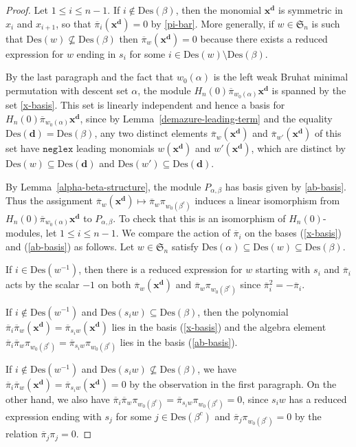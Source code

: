 \documentclass[10pt]{amsart}
\theoremstyle{definition}
\newcommand{\Des}{{\mathrm {Des}}}
\newcommand{\neglex}{{\mathtt {neglex}}}
\newcommand{\symm}{{\mathfrak{S}}}
\newcommand{\xx}{{\mathbf {x}}}
\newcommand{\dd}{{\mathbf {d}}}
\newcommand{\pib}{\overline{\pi}}
\begin{document}
\begin{proof}
Let $1 \leq i \leq n-1$.  If $i \notin \Des(\beta)$, then the monomial $\xx^{\dd}$ is symmetric in $x_i$ and $x_{i+1}$,
so that $\pib_i(\xx^{\dd}) = 0$ by \eqref{pi-bar}.  
More generally, if $w \in \symm_n$ is such that $\Des(w) \not\subseteq \Des(\beta)$ then $\pib_w(\xx^{\dd}) = 0$ because there exists a reduced expression for $w$ ending in $s_i$ for some $i\in\Des(w)\setminus\Des(\beta)$.

By the last paragraph and the fact that $w_0(\alpha)$ is the left weak
Bruhat minimal permutation with descent set $\alpha$,
the module $H_n(0) \pib_{w_0(\alpha)} \xx^{\dd}$ is spanned by the set \eqref{x-basis}.
This set is linearly independent and hence a basis for $H_n(0) \pib_{w_0(\alpha)} \xx^{\dd}$, since by Lemma~\ref{demazure-leading-term} and the equality $\Des(\dd) = \Des(\beta)$, any two distinct elements $\pib_w(\xx^{\dd})$ and $\pib_{w'}(\xx^{\dd})$ of this set have $\neglex$ leading monomials $w(\xx^\dd)$ and $w'(\xx^\dd)$, which are distinct by $\Des(w)\subseteq \Des(\dd)$ and $\Des(w')\subseteq \Des(\dd)$.

By Lemma~\ref{alpha-beta-structure}, the module
$P_{\alpha,\beta}$ has basis given by \eqref{ab-basis}.
Thus the assignment $\pib_w(\xx^{\dd}) \mapsto \pib_w \pi_{w_0(\beta^c)}$ induces a linear isomorphism
from $H_n(0) \pib_{w_0(\alpha)} \xx^{\dd}$  to $P_{\alpha,\beta}$.  To check that this is an isomorphism of 
$H_n(0)$-modules, let $1 \leq i \leq n-1$.  We compare the action of $\pib_i$ on the bases 
(\ref{x-basis}) and (\ref{ab-basis}) as follows.  Let $w \in \symm_n$ satisfy 
$\Des(\alpha) \subseteq \Des(w) \subseteq \Des(\beta)$.

If $i \in \Des(w^{-1})$, then there is a reduced
expression for $w$ starting with $s_i$ and
 $\pib_i$ acts by the scalar $-1$ on both $\pib_w(\xx^{\dd})$
and $\pib_w \pi_{w_0(\beta^c)}$ since $\pib_i^2=-\pib_i$.

If $i \notin \Des(w^{-1})$ and $\Des(s_i w) \subseteq \Des(\beta)$, then 
the polynomial $\pib_i \pib_w (\xx^{\dd}) = \pib_{s_i w}(\xx^{\dd})$ lies in the basis (\ref{x-basis})
and the algebra element $\pib_i \pib_w \pi_{w_0(\beta^c)} = \pib_{s_i w} \pi_{w_0(\beta^c)}$
lies in the basis (\ref{ab-basis}).

If $i \notin \Des(w^{-1})$ and $\Des(s_i w) \not\subseteq \Des(\beta)$, we have 
$\pib_i \pib_w (\xx^{\dd}) = \pib_{s_i w} (\xx^{\dd}) = 0$ by the observation in the first paragraph.
On the other hand, we also have $\pib_i \pib_w \pi_{w_0(\beta^c)} = \pib_{s_iw}\pi_{w_0(\beta^c)} = 0$, since $s_iw$ has a reduced expression ending with $s_j$ for some $j\in\Des(\beta^c)$ and $\pib_j\pi_{w_0(\beta^c)}=0$ by the relation $\pib_j\pi_j=0$.
\end{proof}
\end{document}

